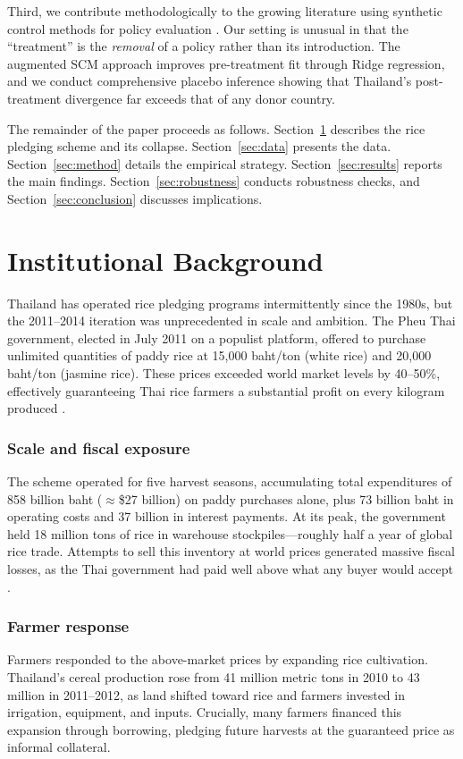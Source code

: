 \documentclass[12pt]{article}
\begin{document}
Third, we contribute methodologically to the growing literature using synthetic control methods for policy evaluation \citep{abadie2003, abadie2010, abadie2015}. Our setting is unusual in that the ``treatment'' is the \textit{removal} of a policy rather than its introduction. The augmented SCM approach \citep{ben2021augmented} improves pre-treatment fit through Ridge regression, and we conduct comprehensive placebo inference showing that Thailand's post-treatment divergence far exceeds that of any donor country.

The remainder of the paper proceeds as follows. Section~\ref{sec:background} describes the rice pledging scheme and its collapse. Section~\ref{sec:data} presents the data. Section~\ref{sec:method} details the empirical strategy. Section~\ref{sec:results} reports the main findings. Section~\ref{sec:robustness} conducts robustness checks, and Section~\ref{sec:conclusion} discusses implications.

\section{Institutional Background}\label{sec:background}

Thailand has operated rice pledging programs intermittently since the 1980s, but the 2011--2014 iteration was unprecedented in scale and ambition. The Pheu Thai government, elected in July 2011 on a populist platform, offered to purchase unlimited quantities of paddy rice at 15,000 baht/ton (white rice) and 20,000 baht/ton (jasmine rice). These prices exceeded world market levels by 40--50\%, effectively guaranteeing Thai rice farmers a substantial profit on every kilogram produced \citep{poapongsakorn2014}.

\subsubsection*{Scale and fiscal exposure} The scheme operated for five harvest seasons, accumulating total expenditures of 858 billion baht ($\approx$\$27 billion) on paddy purchases alone, plus 73 billion baht in operating costs and 37 billion in interest payments. At its peak, the government held 18 million tons of rice in warehouse stockpiles---roughly half a year of global rice trade. Attempts to sell this inventory at world prices generated massive fiscal losses, as the Thai government had paid well above what any buyer would accept \citep{permani2016}.

\subsubsection*{Farmer response} Farmers responded to the above-market prices by expanding rice cultivation. Thailand's cereal production rose from 41 million metric tons in 2010 to 43 million in 2011--2012, as land shifted toward rice and farmers invested in irrigation, equipment, and inputs. Crucially, many farmers financed this expansion through borrowing, pledging future harvests at the guaranteed price as informal collateral.
\end{document}
